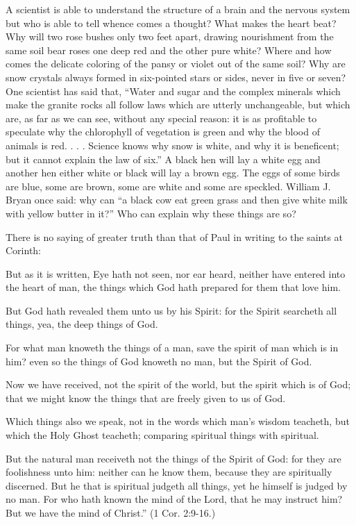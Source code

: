 A scientist is able to understand the structure of a brain and the nervous system but who is
able to tell whence comes a thought? What makes the heart beat? Why will two rose bushes
only two feet apart, drawing nourishment from the same soil bear roses one deep red and the
other pure white? Where and how comes the delicate coloring of the pansy or violet out of
the same soil? Why are snow crystals always formed in six-pointed stars or sides, never in
five or seven? One scientist has said that, ``Water and sugar and the complex minerals which
make the granite rocks all follow laws which are utterly unchangeable, but which are, as far
as we can see, without any special reason: it is as profitable to speculate why the chlorophyll
of vegetation is green and why the blood of animals is red. . . . Science knows why snow is
white, and why it is beneficent; but it cannot explain the law of six.'' A black hen will lay a
white egg and another hen either white or black will lay a brown egg. The eggs of some birds
are blue, some are brown, some are white and some are speckled. William J. Bryan once
said: why can ``a black cow eat green grass and then give white milk with yellow butter in
it?'' Who can explain why these things are so?

There is no saying of greater truth than that of Paul in writing to the saints at Corinth:

But as it is written, Eye hath not seen, nor ear heard, neither have entered into the heart of
man, the things which God hath prepared for them that love him.

But God hath revealed them unto us by his Spirit: for the Spirit searcheth all things, yea, the
deep things of God.

For what man knoweth the things of a man, save the spirit of man which is in him? even so
the things of God knoweth no man, but the Spirit of God.

Now we have received, not the spirit of the world, but the spirit which is of God; that we
might know the things that are freely given to us of God.

Which things also we speak, not in the words which man's wisdom teacheth, but which the
Holy Ghost teacheth; comparing spiritual things with spiritual.

But the natural man receiveth not the things of the Spirit of God: for they are foolishness
unto him: neither can he know them, because they are spiritually discerned.
But he that is spiritual judgeth all things, yet he himself is judged by no man.
For who hath known the mind of the Lord, that he may instruct him? But we have the mind
of Christ.'' (1 Cor. 2:9-16.)

